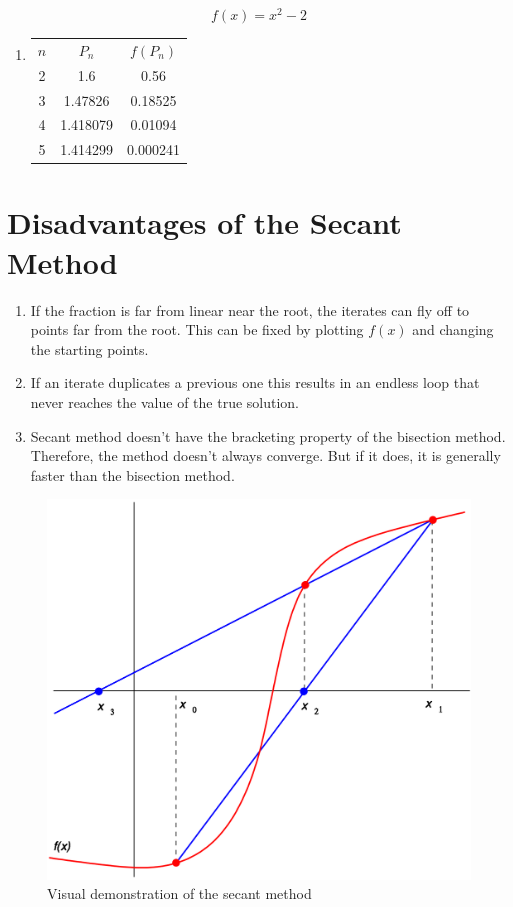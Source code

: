 \documentclass[]{article}
\begin{document}
\[ f(x) = x^2 - 2 \]

\begin{enumerate}
	\item[]
	\centering
	\begin{tabular}{c c c}
		$ n $ & $ P_{n} $ & $ f(P_n) $ \\
		2&1.6&0.56\\
		3&1.47826&0.18525\\
		4&1.418079&0.01094\\
		5&1.414299&0.000241 
	\end{tabular}
\end{enumerate}

\section*{Disadvantages of the Secant Method}

\begin{enumerate}
	\item If the fraction is far from linear near the root, the iterates can fly off to points far from the root. This can be fixed by plotting $ f(x) $ and changing the starting points.
	
	\item If an iterate duplicates a previous one this results in an endless loop that never reaches the value of the true solution.
	
	\item Secant method doesn't have the bracketing property of the bisection method. Therefore, the method doesn't always converge. But if it does, it is generally faster than the bisection method.
\end{enumerate}


\begin{figure}[h!]
	\centering
	\includegraphics[width= 0.8\linewidth]{secant.png}
	\caption{Visual demonstration of the secant method}
\end{figure}
\end{document}
